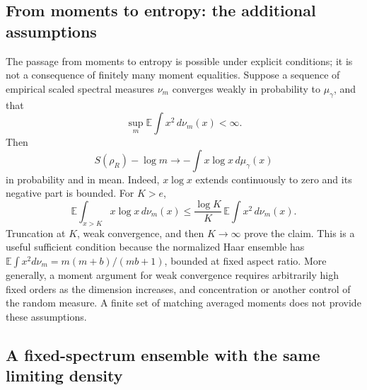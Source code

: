 \documentclass[11pt,letterpaper]{article}
\theoremstyle{plain}
\theoremstyle{definition}
\theoremstyle{remark}
\begin{document}
\subsection{From moments to entropy: the additional assumptions}
\label{subsec05:level_two}
\label{rem05:moments_determine}

The passage from moments to entropy is possible under explicit
conditions; it is not a consequence of finitely many moment equalities.
Suppose a sequence of empirical scaled spectral measures $\nu_m$
converges weakly in probability to $\mu_\gamma$, and that
\begin{equation}
\label{eq05:tail_condition}
 \sup_m\mathbb E\!\int x^2\,d\nu_m(x)<\infty.
\end{equation}
Then
\begin{equation}
\label{eq05:entropy_limit}
 S(\rho_R)-\log m
 \longrightarrow-\int x\log x\,d\mu_\gamma(x)
\end{equation}
in probability and in mean.  Indeed, $x\log x$ extends continuously
to zero and its negative part is bounded.  For $K>e$,
\begin{equation}
\label{eq05:tail_bound}
 \mathbb E\!\int_{x>K}x\log x\,d\nu_m(x)
 \leq\frac{\log K}{K}\,
      \mathbb E\!\int x^2\,d\nu_m(x).
\end{equation}
Truncation at $K$, weak convergence, and then $K\to\infty$ prove the
claim.  This is a useful sufficient condition because the normalized
Haar ensemble has
$\mathbb E\int x^2d\nu_m=m(m+b)/(mb+1)$, bounded at fixed
aspect ratio.  More generally, a moment argument for weak convergence
requires arbitrarily high fixed orders as the dimension increases,
and concentration or another control of the random measure.  A finite
set of matching averaged moments does not provide these assumptions.

\subsection{A fixed-spectrum ensemble with the same limiting density}
\label{subsec05:fixed_spectrum}
\label{subsec05:level_four}
\end{document}
